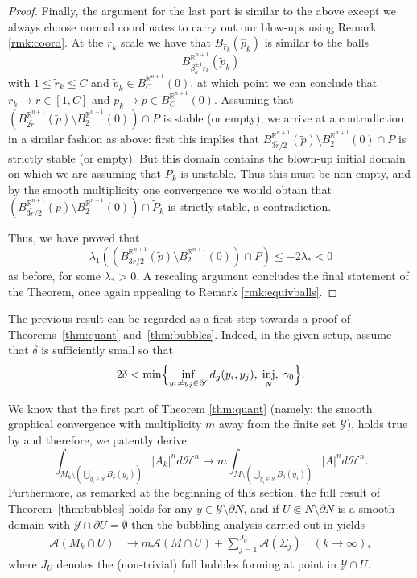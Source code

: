 \documentclass[10pt]{amsart}
\let\mathcal\mathscr
\DeclareMathOperator{\inj}{inj}
\theoremstyle{definition}
\newcommand{\R}{\mathbb{R}}
\newcommand{\h}{\mathscr{H}}
\let\cemb\Subset
\begin{document}
\begin{proof}
Finally, the argument for the last part is similar to the above except we always choose normal coordinates to carry out our blow-ups using Remark \ref{rmk:coord}. At the $r_k$ scale we have that $B_{\widehat{r}_k}(\widehat{p}_k)$ is similar to the balls
$$B^{\R^{n+1}}_{\beta_k^{\pm 1}\widetilde{r}_k}(\widetilde{p}_k)$$ with $1\leq \widetilde{r}_k \leq C$ and $\widetilde{p}_k\in B^{\R^{n+1}}_C(0)$, at which point we can conclude that $\widetilde{r}_k \to \widetilde{r}\in [1,C]$ and $\widetilde{p}_k \to \widetilde{p}\in B^{\R^{n+1}}_C(0)$.
Assuming that $(B^{\R^{n+1}}_{2\widetilde{r}}(\widetilde{p})\setminus B^{\R^{n+1}}_2(0))\cap P$ is stable (or empty), we arrive at a contradiction in a similar fashion as above: first this implies that $B_{3\widetilde{r}/2}^{\R^{n+1}}(\widetilde{p})\setminus B_2^{\R^{n+1}}(0)\cap P$ is strictly stable (or empty). But this domain contains the blown-up initial domain on which we are assuming that $P_k$ is unstable. Thus this must be non-empty, and by the smooth multiplicity one convergence we would obtain that $(B_{3\widetilde{r}/2}^{\R^{n+1}}(\widetilde{p})\setminus B_2^{\R^{n+1}}(0))\cap \widetilde{P}_k$ is strictly stable, a contradiction.

Thus, we have proved that $$\lambda_1 ((B^{\R^{n+1}}_{3\widetilde{r}/2}(\widetilde{p})\setminus B^{\R^{n+1}}_2(0))\cap P)\leq -2\lambda_{\ast}<0 $$ as before, for some $\lambda_{\ast}>0$. A rescaling argument concludes the final statement of the Theorem, once again appealing to Remark \ref{rmk:equivballs}.
\end{proof}

The previous result can be regarded as a first step towards a proof of Theorems~\ref{thm:quant} and~\ref{thm:bubbles}. Indeed, in the given setup, assume that $\delta$ is sufficiently small so that
\begin{equation*}
2\delta<\min\Bigl\{\inf_{ y_i\neq y_j\in \mathcal{Y}} d_g(y_i,y_j),\; \inj_N,\;\gamma_0 \Bigr\}.
\end{equation*}

We know that the first part of Theorem \ref{thm:quant} (namely: the smooth graphical convergence with multiplicity $m$ away from the finite set $\mathcal{Y}$), holds true by \cite{ACS17} and therefore, we patently derive
\begin{equation*}
\int_{M_k\setminus \left(\bigcup_{y_i \in \mathcal{Y}} B_{\delta}(y_i)\right)} |A_k|^n d \h^n \to m \int_{M\setminus \left(\bigcup_{y_i \in \mathcal{Y}} B_{\delta}(y_i)\right)} |A|^n d \h^n.
\end{equation*}
Furthermore, as remarked at the beginning of this section, the full result of Theorem~\ref{thm:bubbles} holds for any $y\in \mathcal{Y}\setminus\partial N$, and if $U\cemb N\setminus \partial N$ is a smooth domain with $\mathcal{Y}\cap \partial U=\emptyset$ then the bubbling analysis carried out in \cite{BS17} yields
\begin{align*}
\mathcal{A}(M_k\cap U) &\to m\mathcal{A}(M\cap U) + \sum_{j=1}^{J_U} \mathcal{A}(\Sigma_j) \quad (k\to\infty),
\end{align*}
where $J_U$ denotes the (non-trivial) full bubbles forming at point in $\mathcal{Y}\cap U$.
\end{document}
